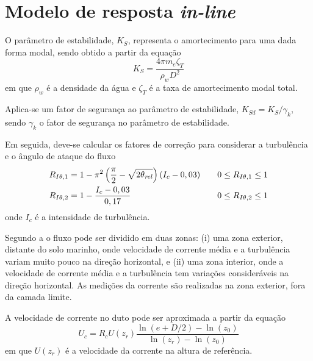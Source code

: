 \section{Modelo de resposta \textit{in-line}}
\label{sec:modelo-resposta-inline}

O parâmetro de estabilidade, $K_S$, representa o amortecimento para uma dada forma modal, sendo obtido a partir da equação
\begin{equation}
\label{eq:jdsn-Ks}
K_S = \frac{4 \pi m_e \zeta_T}{\rho_w D^2}
\end{equation}
em que $\rho_w$ é a densidade da água e $\zeta_T$ é a taxa de amortecimento modal total.

Aplica-se um fator de segurança ao parâmetro de estabilidade, $K_\mathit{Sd} = K_S/\gamma_k$, sendo $\gamma_k$ o fator de segurança no parâmetro de estabilidade.

Em seguida, deve-se calcular os fatores de correção para considerar a turbulência e o ângulo de ataque do fluxo
\begin{equation}
\label{eq:jdsn-Riot}
\begin{aligned}
	R_{I\theta,1} &= 1 - \pi^2\left(\frac{\pi}{2} - \sqrt{2 \theta_\mathit{rel}}\right)(I_c - 0,03) & \quad \mbox 0 \leq R_{I\theta,1} \leq 1\\
    R_{I\theta,2} &= 1 - \frac{I_c - 0,03}{0,17}                                                    & \quad \mbox  0 \leq R_{I\theta,2} \leq 1
\end{aligned}
\end{equation}
onde $I_c$ é a intensidade de turbulência.

Segundo a  o fluxo pode ser dividido em duas zonas:
(i) uma zona exterior, distante do solo marinho, onde velocidade de corrente média e a turbulência variam muito pouco na direção horizontal, e
(ii) uma zona interior, onde a velocidade de corrente média e a turbulência tem variações consideráveis na direção horizontal.
As medições da corrente são realizadas na zona exterior, fora da camada limite.

A velocidade de corrente no duto pode ser aproximada a partir da equação
\begin{equation}
\label{eq:jdsn-eq1}
U_c = R_c U(z_r) \frac{\ln{(e+D/2)} - \ln(z_0)}{\ln (z_r)- \ln (z_0)}
\end{equation}
em que $U(z_r)$ é a velocidade da corrente na altura de referência.



